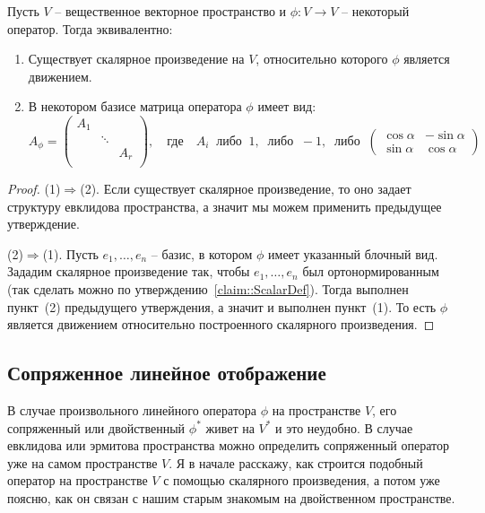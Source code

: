 \begin{claim}
Пусть $V$ -- вещественное векторное пространство и $\phi\colon V\to V$ -- некоторый оператор.
Тогда эквивалентно:
\begin{enumerate}
\item Существует скалярное произведение на $V$, относительно которого $\phi$ является движением.

\item В некотором базисе матрица оператора $\phi$ имеет вид:
\[
A_\phi=
\begin{pmatrix}
{A_1}&{}&{}\\
{}&{\ddots}&{}\\
{}&{}&{A_r}\\
\end{pmatrix},
\quad\text{где}\quad
A_i\;\;\text{либо}\;\;1,\;\;\text{либо}\;\;-1,\;\;\text{либо}\;\;
\begin{pmatrix}
{\cos \alpha}&{-\sin\alpha}\\
{\sin\alpha}&{\cos\alpha}
\end{pmatrix}
\]
\end{enumerate}
\end{claim}
\begin{proof}
(1)$\Rightarrow$(2).
Если существует скалярное произведение, то оно задает структуру евклидова пространства, а значит мы можем применить предыдущее утверждение.

(2)$\Rightarrow$(1).
Пусть $e_1,\ldots,e_n$ -- базис, в котором $\phi$ имеет указанный блочный вид.
Зададим скалярное произведение так, чтобы $e_1,\ldots,e_n$ был ортонормированным (так сделать можно по утверждению~\ref{claim::ScalarDef}).
Тогда выполнен пункт~(2) предыдущего утверждения, а значит и выполнен пункт~(1).
То есть $\phi$ является движением относительно построенного скалярного произведения.
\end{proof}


\subsection{Сопряженное линейное отображение}

В случае произвольного линейного оператора $\phi$ на пространстве $V$, его сопряженный или двойственный $\phi^*$ живет на $V^*$ и это неудобно.
В случае евклидова или эрмитова пространства можно определить сопряженный оператор уже на самом пространстве $V$.
Я в начале расскажу, как строится подобный оператор на пространстве $V$ с помощью скалярного произведения, а потом уже поясню, как он связан с нашим старым знакомым на двойственном пространстве.

